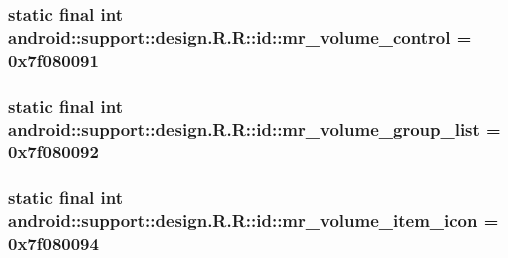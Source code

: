 \hypertarget{classandroid_1_1support_1_1design_1_1_r_1_1id_e46f24fa1a9b68b98c0d92591ad0d612}{
\subsubsection[{mr\_\-volume\_\-control}]{\setlength{\rightskip}{0pt plus 5cm}static final int android::support::design.R.R::id::mr\_\-volume\_\-control = 0x7f080091}}
\label{classandroid_1_1support_1_1design_1_1_r_1_1id_e46f24fa1a9b68b98c0d92591ad0d612}


\hypertarget{classandroid_1_1support_1_1design_1_1_r_1_1id_f0d89d2028f0787aa2414d99650e388b}{
\subsubsection[{mr\_\-volume\_\-group\_\-list}]{\setlength{\rightskip}{0pt plus 5cm}static final int android::support::design.R.R::id::mr\_\-volume\_\-group\_\-list = 0x7f080092}}
\label{classandroid_1_1support_1_1design_1_1_r_1_1id_f0d89d2028f0787aa2414d99650e388b}


\hypertarget{classandroid_1_1support_1_1design_1_1_r_1_1id_a6374720c148f45c8f2d32a32c6b04fb}{
\subsubsection[{mr\_\-volume\_\-item\_\-icon}]{\setlength{\rightskip}{0pt plus 5cm}static final int android::support::design.R.R::id::mr\_\-volume\_\-item\_\-icon = 0x7f080094}}
\label{classandroid_1_1support_1_1design_1_1_r_1_1id_a6374720c148f45c8f2d32a32c6b04fb}


